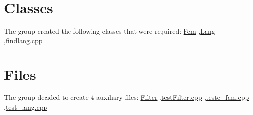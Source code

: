 \hypertarget{index_Classes}{}\section{Classes}\label{index_Classes}
The group created the following classes that were required\+: \hyperlink{classFcm}{Fcm} ,\hyperlink{classLang}{Lang} ,\hyperlink{findlang_8cpp}{findlang.\+cpp}\hypertarget{index_Auxiliary}{}\section{Files}\label{index_Auxiliary}
The group decided to create 4 auxiliary files\+: \hyperlink{classFilter}{Filter} ,\hyperlink{testFilter_8cpp}{test\+Filter.\+cpp} ,\hyperlink{teste__fcm_8cpp}{teste\+\_\+fcm.\+cpp} ,\hyperlink{test__lang_8cpp}{test\+\_\+lang.\+cpp} 